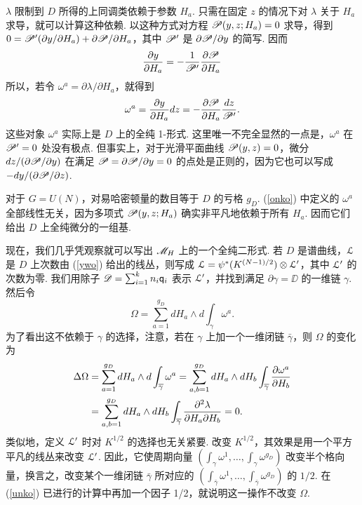 $\lambda$ 限制到 $D$ 所得的上同调类依赖于参数 $H_a$. 只需在固定 $z$ 的情况下对 $\lambda$ 关于 $H_a$ 求导，就可以计算这种依赖. 以这种方式对方程 $\PP(y,z;H_a)=0$ 求导，得到 $0=\PP'(\partial y/\partial H_a)+\partial
\PP/\partial H_a$，其中 $\PP'$ 是 $\partial
\PP/\partial y$ 的简写. 因而
\begin{equation}\label{zonko} {\partial y\over \partial
H_a}=-{1\over \PP'}{\partial \PP\over \partial H_a}\end{equation}
所以，若令 $\omega^a=\partial \lambda/\partial H_a$，就得到
\begin{equation}\label{onko} \omega^a={\partial y\over \partial
H_a}dz=-{\partial \PP\over\partial H_a}{dz\over
\PP'}.\end{equation} 这些对象 $\omega^a$ 实际上是 $D$ 上的全纯 1-形式. 这里唯一不完全显然的一点是，$\omega^a$ 在 $\PP'=0$ 处没有极点. 但事实上，对于光滑平面曲线 $\PP(y,z)=0$，微分 $dz/(\partial \PP/\partial y)$ 在满足 $\PP=\partial \PP/\partial y=0$ 的点处是正则的，因为它也可以写成 $-dy/(\partial \PP/\partial z)$.

对于 $G=U(N)$，对易哈密顿量的数目等于 $D$ 的亏格 $g_D$. (\ref{onko}) 中定义的 $\omega^a$ 全部线性无关，因为多项式 $\PP(y,z;H_a)$ 确实非平凡地依赖于所有 $H_a$. 因而它们给出 $D$ 上全纯微分的一组基.

现在，我们几乎凭观察就可以写出 $\MH$ 上的一个全纯二形式. 若 $D$ 是谱曲线，${\cal L}$ 是 $D$ 上次数由 (\ref{ywo}) 给出的线丛，则写成 ${\cal L}=\psi^*(K^{(N-1)/2})\otimes {\cal L}'$，其中 ${\cal L}'$ 的次数为零. 我们用除子 ${\DD}=\sum_{i=1}^kn_i\qq_i$ 表示 ${\cal L}'$，并找到满足 $\partial\gamma={\DD}$ 的一维链 $\gamma$. 然后令
\begin{equation}\label{dunko}
\Omega=\sum_{a=1}^{g_D} dH_a\wedge d\int_\gamma
\omega^a.\end{equation} 为了看出这不依赖于 $\gamma$ 的选择，注意，若在 $\gamma$ 上加一个一维闭链 $\bar\gamma$，则 $\Omega$ 的变化为
\begin{align}\label{unko}
\Delta\Omega& =\sum_{a=1}^{g_D} dH_a\wedge d\int_{\bar\gamma}
\omega^a =\sum_{a,b=1}^{g_D}dH_a\wedge dH_b\int_{\bar
\gamma}{\partial \omega^a\over \partial H_b}\\
\nonumber &=\sum_{a,b=1}^{g_D}dH_a\wedge dH_b\int_{\bar
\gamma}{\partial^2 \lambda\over\partial H_a\partial
H_b}=0.\end{align} 类似地，定义 ${\cal L}'$ 时对 $K^{1/2}$ 的选择也无关紧要. 改变 $K^{1/2}$，其效果是用一个平方平凡的线丛来改变 ${\cal L}'$. 因此，它使周期向量 $(\int_\gamma\omega^1,\dots,\int_\gamma\omega^{g_D})$ 改变半个格向量，换言之，改变某个一维闭链 $\bar\gamma$ 所对应的 $(\int_{\bar
\gamma}\omega^1,\dots,\int_{\bar \gamma}\omega^{g_D})$ 的 $1/2$. 在 (\ref{unko}) 已进行的计算中再加一个因子 1/2，就说明这一操作不改变 $\Omega$.

